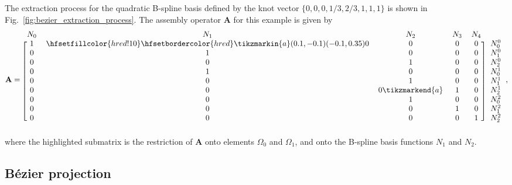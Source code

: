 The \Bezier extraction process for the quadratic B-spline basis defined by the knot vector $\{0,0,0,1/3,2/3,1,1,1\}$ is shown in Fig.~\ref{fig:bezier_extraction_process}. The assembly operator $\mathbf{A}$ for this example is given by
\begin{equation}\label{eq:assembly_matrix}
	\mathbf{A} =
	\begin{blockarray}{cccccc}
		N_0 & N_1  & N_2  & N_3  & N_4 \\
		\begin{block}{[ccccc]c}
			1 & \hfsetfillcolor{hred!10}\hfsetbordercolor{hred}\tikzmarkin{a}(0.1,-0.1)(-0.1,0.35)0 & 0 & 0 & 0 & N_0^0 \\
			0 & 1 & 0 & 0 & 0 & N_1^0 \\
			0 & 0 & 1 & 0 & 0 & N_2^0 \\
			0 & 1 & 0 & 0 & 0 & N_0^1 \\
			0 & 0 & 1 & 0 & 0 & N_1^1 \\
			0 & 0 & 0\tikzmarkend{a} & 1 & 0 & N_2^1 \\
			0 & 0 & 1 & 0 & 0 & N_0^2 \\
			0 & 0 & 0 & 1 & 0 & N_1^2 \\
			0 & 0 & 0 & 0 & 1 & N_2^2 \\
		\end{block}
	\end{blockarray},
\end{equation}
where the highlighted submatrix is the restriction of $\mathbf{A}$ onto elements $\Omega_0$ and $\Omega_1$, and onto the B-spline basis functions $N_1$ and $N_2$.

\subsection{B\'ezier projection}
\label{sec:bproject}

